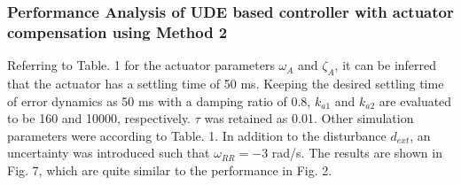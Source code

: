 \documentclass[conference]{IEEEtran}
\begin{document}
\subsubsection{Performance Analysis of UDE based controller with actuator compensation using Method 2}
Referring to Table. 1 for the actuator parameters $\omega_A$ and $\zeta_A$, it can be inferred that the actuator has a settling time of 50 ms. Keeping the desired settling time of error dynamics as 50 ms with a damping ratio of 0.8, $k_{a1}$ and $k_{a2}$ are evaluated to be 160 and 10000, respectively. $\tau$ was retained as 0.01. Other simulation parameters were according to Table. 1. In addition to the disturbance $d_{ext}$, an uncertainty was introduced such that $\omega_{RR}= -3$ rad/s.
The results are shown in Fig. 7, which are quite similar to the performance in Fig. 2. 
\end{document}
